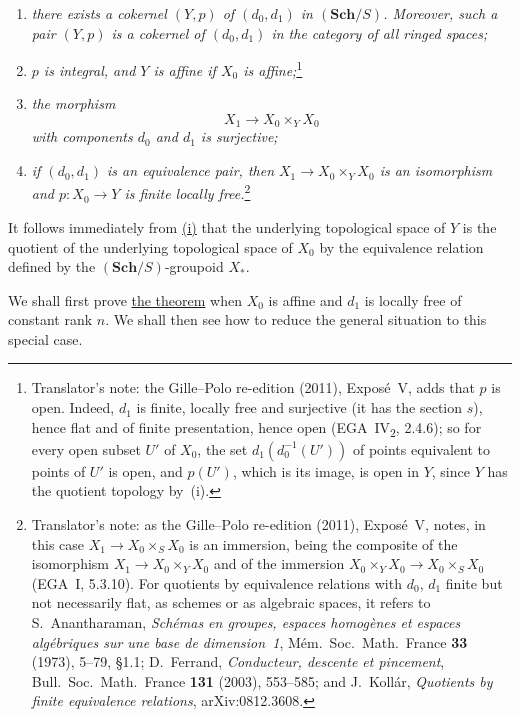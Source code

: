 \begin{enumerate}
\item[(i)]\label{thm:sga3-V-4.1-i}%
  \textit{there exists a cokernel \((Y,p)\) of \((d_0,d_1)\) in
  \((\mathbf{Sch}/S)\). Moreover, such a pair \((Y,p)\) is a
  cokernel of \((d_0,d_1)\) in the category of all ringed spaces;}
\item[\SGAInlineRefTarget{thm:sga3-V-4.1:item:ii}(ii)]\label{thm:sga3-V-4.1-ii}%
  \textit{\(p\) is integral, and \(Y\) is affine if
  \(X_0\) is affine;}\footnote{Translator's note: the Gille--Polo re-edition (2011), Exposé~V, adds
that \(p\) is open. Indeed, \(d_1\) is finite, locally free and surjective (it
has the section \(s\)), hence flat and of finite presentation, hence open
(EGA~IV\textsubscript{2}, 2.4.6); so for every open subset \(U'\) of \(X_0\), the
set \(d_1(d_0^{-1}(U'))\) of points equivalent to points of \(U'\) is open, and
\(p(U')\), which is its image, is open in \(Y\), since \(Y\) has the quotient
topology by~(i).}
\item[(iii)]\label{thm:sga3-V-4.1-iii}%
  \textit{the morphism
  \[
    X_1\longrightarrow X_0\times_YX_0
  \]
  with components \(d_0\) and \(d_1\) is surjective;}
\item[(iv)]\label{thm:sga3-V-4.1-iv}%
  \textit{if \((d_0,d_1)\) is an equivalence pair, then
  \(X_1\to X_0\times_YX_0\) is an isomorphism}
  \textit{and \(p:X_0\to Y\) is finite locally free.}\footnote{Translator's note: as the Gille--Polo re-edition (2011), Exposé~V,
notes, in this case \(X_1\to X_0\times_SX_0\) is an immersion, being the
composite of the isomorphism \(X_1\to X_0\times_YX_0\) and of the immersion
\(X_0\times_YX_0\to X_0\times_SX_0\) (EGA~I, 5.3.10). For quotients by
equivalence relations with \(d_0\), \(d_1\) finite but not necessarily flat, as
schemes or as algebraic spaces, it refers to S.~Anantharaman, \emph{Schémas en
groupes, espaces homogènes et espaces algébriques sur une base de
dimension~1}, Mém.\ Soc.\ Math.\ France \textbf{33} (1973), 5--79, \S1.1;
D.~Ferrand, \emph{Conducteur, descente et pincement}, Bull.\ Soc.\ Math.\
France \textbf{131} (2003), 553--585; and J.~Kollár, \emph{Quotients by finite
equivalence relations}, arXiv:0812.3608.}
\end{enumerate}

It follows immediately from \hyperref[thm:sga3-V-4.1-i]{(i)} that the underlying topological space
of \(Y\) is the quotient of the underlying topological space of
\(X_0\) by the equivalence relation defined by the
\((\mathbf{Sch}/S)\)-groupoid \(X_\ast\).

We shall first prove \hyperref[thm:sga3-V-4.1]{the theorem} when \(X_0\) is affine and \(d_1\) is
locally free of constant rank \(n\). We shall then see how to reduce
the general situation to this special case.
